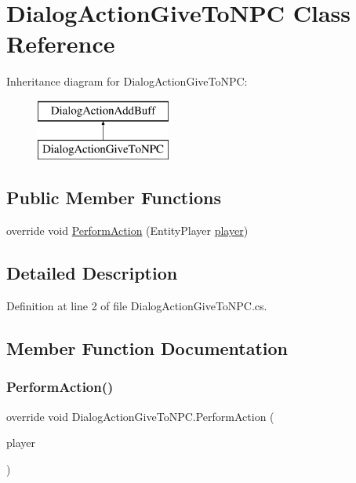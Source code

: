 \hypertarget{class_dialog_action_give_to_n_p_c}{}\section{Dialog\+Action\+Give\+To\+N\+PC Class Reference}
\label{class_dialog_action_give_to_n_p_c}
Inheritance diagram for Dialog\+Action\+Give\+To\+N\+PC\+:\begin{figure}[H]
\begin{center}
\leavevmode
\includegraphics[height=2.000000cm]{d9/d92/class_dialog_action_give_to_n_p_c}
\end{center}
\end{figure}
\subsection*{Public Member Functions}
\begin{DoxyCompactItemize}
\item 
override void \mbox{\hyperlink{class_dialog_action_give_to_n_p_c_aad753ab451ee750a6f3d147bf5d94f1f}{Perform\+Action}} (Entity\+Player \mbox{\hyperlink{_sphere_i_i_01_music_01_boxes_2_config_2_localization_8txt_a4e2cb8aeff651600ea1cc57fe5a929a4}{player}})
\end{DoxyCompactItemize}


\subsection{Detailed Description}


Definition at line 2 of file Dialog\+Action\+Give\+To\+N\+P\+C.\+cs.



\subsection{Member Function Documentation}
\mbox{\label{class_dialog_action_give_to_n_p_c_aad753ab451ee750a6f3d147bf5d94f1f}} 
\subsubsection{\texorpdfstring{PerformAction()}{PerformAction()}}
{\footnotesize\ttfamily override void Dialog\+Action\+Give\+To\+N\+P\+C.\+Perform\+Action (\begin{DoxyParamCaption}\item[{Entity\+Player}]{player }\end{DoxyParamCaption})}



